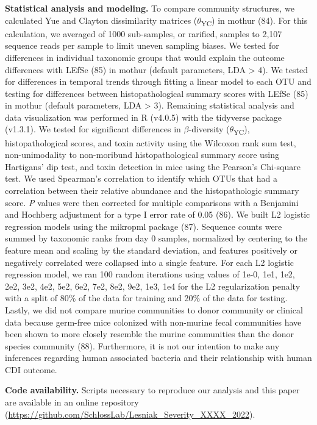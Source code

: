 \documentclass[
  12pt,
]{article}
\begin{document}
\textbf{Statistical analysis and modeling.} To compare community
structures, we calculated Yue and Clayton dissimilarity matrices
(\(\theta\)\textsubscript{YC}) in mothur (84). For this calculation, we
averaged of 1000 sub-samples, or rarified, samples to 2,107 sequence
reads per sample to limit uneven sampling biases. We tested for
differences in individual taxonomic groups that would explain the
outcome differences with LEfSe (85) in mothur (default parameters, LDA
\textgreater{} 4). We tested for differences in temporal trends through
fitting a linear model to each OTU and testing for differences between
histopathological summary scores with LEfSe (85) in mothur (default
parameters, LDA \textgreater{} 3). Remaining statistical analysis and
data visualization was performed in R (v4.0.5) with the tidyverse
package (v1.3.1). We tested for significant differences in
\(\beta\)-diversity (\(\theta\)\textsubscript{YC}), histopathological
scores, and toxin activity using the Wilcoxon rank sum test,
non-unimodality to non-moribund histopathological summary score using
Hartigans' dip test, and toxin detection in mice using the Pearson's
Chi-square test. We used Spearman's correlation to identify which OTUs
that had a correlation between their relative abundance and the
histopathologic summary score. \emph{P} values were then corrected for
multiple comparisons with a Benjamini and Hochberg adjustment for a type
I error rate of 0.05 (86). We built L2 logistic regression models using
the mikropml package (87). Sequence counts were summed by taxonomic
ranks from day 0 samples, normalized by centering to the feature mean
and scaling by the standard deviation, and features positively or
negatively correlated were collapsed into a single feature. For each L2
logistic regression model, we ran 100 random iterations using values of
1e-0, 1e1, 1e2, 2e2, 3e2, 4e2, 5e2, 6e2, 7e2, 8e2, 9e2, 1e3, 1e4 for the
L2 regularization penalty with a split of 80\% of the data for training
and 20\% of the data for testing. Lastly, we did not compare murine
communities to donor community or clinical data because germ-free mice
colonized with non-murine fecal communities have been shown to more
closely resemble the murine communities than the donor species community
(88). Furthermore, it is not our intention to make any inferences
regarding human associated bacteria and their relationship with human
CDI outcome.

\textbf{Code availability.} Scripts necessary to reproduce our analysis
and this paper are available in an online repository
(\url{https://github.com/SchlossLab/Lesniak_Severity_XXXX_2022}).
\end{document}
